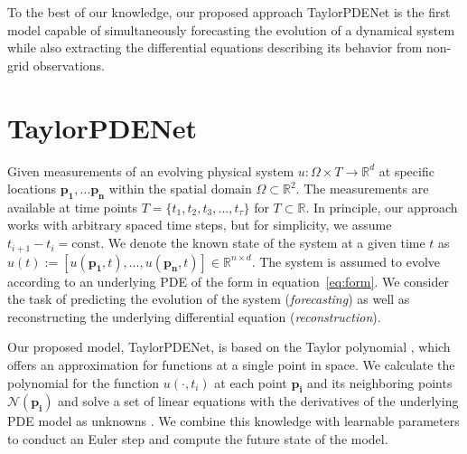 \documentclass[runningheads]{llncs}
\begin{document}
To the best of our knowledge, our proposed approach TaylorPDENet is the first model capable of simultaneously forecasting the evolution of a dynamical system while also extracting the differential equations describing its behavior from non-grid observations.

\section{TaylorPDENet}
Given measurements of an evolving physical system $u\colon \Omega\times T\rightarrow \mathbb{R}^d$ at specific locations $\mathbf{p_1}, \ldots \mathbf{p_n}$ within the spatial domain $\Omega \subset \mathbb{R}^2$.
The measurements are available at time points $T = \{t_1, t_2, t_3,\dots, t_{\tau}\}$ for $T\subset \mathbb{R}$.
In principle, our approach works with arbitrary spaced time steps, but for simplicity, we assume $t_{i+1}-t_i=\text{const}$.
We denote the known state of the system at a given time $t$ as $u(t) := [u(\mathbf{p_1}, t), \ldots, u(\mathbf{p_n}, t)]\in \mathbb{R}^{n\times d}$.
The system is assumed to evolve according to an underlying PDE of the form in equation~\ref{eq:form}.
We consider the task of predicting the evolution of the system (\textit{forecasting}) as well as reconstructing the underlying differential equation (\textit{reconstruction}).

Our proposed model, TaylorPDENet, is based on the Taylor polynomial \cite{sezer2005taylor}, which offers an approximation for functions at a single point in space. 
We calculate the polynomial for the function $u(\cdot, t_i)$ at each point $\mathbf{p_i}$ and its neighboring points $\mathcal{N}(\mathbf{p_i})$ and solve a set of linear equations with the derivatives of the underlying PDE model as unknowns \cite{gulsu2006taylor}.
We combine this knowledge with learnable parameters to conduct an Euler step \cite{biswas2013discussion} and compute the future state of the model.
\end{document}
